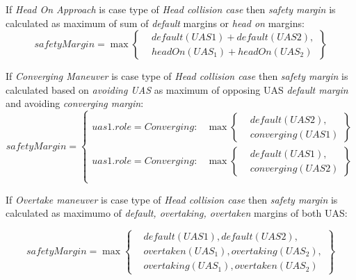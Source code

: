 If \emph{Head On Approach} is case type of \emph{Head collision case} then \emph{safety margin} is calculated as maximum of sum of \emph{default} margins or \emph{head on} margins:
\begin{equation}
    safetyMargin = \max\left\{\begin{aligned}&default(UAS1)+default(UAS2),\\ &headOn(UAS_1)+headOn(UAS_2)\end{aligned}\right\}
\end{equation}

If \emph{Converging Maneuver} is case type of \emph{Head collision case} then \emph{safety margin} is calculated based on \emph{avoiding UAS} as maximum of opposing UAS \emph{default margin} and avoiding \emph{converging margin}:
\begin{equation}
    safetyMargin = 
    \begin{cases}
        uas1.role = Converging :& \max\left\{\begin{aligned}&default(UAS2),\\&converging(UAS1)\end{aligned}\right\} \\
        uas1.role = Converging :&   \max\left\{\begin{aligned}&default(UAS1),\\&converging(UAS2)\end{aligned}\right\} \\
    \end{cases}
\end{equation}

If \emph{Overtake maneuver} is case type of \emph{Head collision case} then \emph{safety margin} is calculated as maximumo of \emph{default, overtaking, overtaken} margins of both UAS:

\begin{equation}
    safetyMargin = \max\left\{\begin{aligned}&default(UAS1),default(UAS2),\\ &overtaken(UAS_1),overtaking(UAS_2),\\&overtaking(UAS_1),overtaken(UAS_2)\end{aligned}\right\}
\end{equation}

